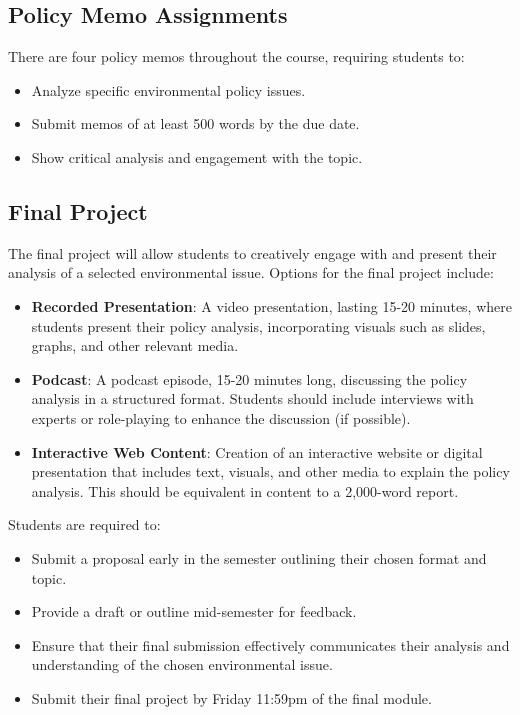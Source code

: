 \documentclass[12pt, letterpaper]{article}
\begin{document}
\subsection*{Policy Memo Assignments}
There are four policy memos throughout the course, requiring students to:
\begin{itemize}
    \item Analyze specific environmental policy issues.
    \item Submit memos of at least 500 words by the due date.
    \item Show critical analysis and engagement with the topic.
\end{itemize}

\subsection*{Final Project}
The final project will allow students to creatively engage with and present their analysis of a selected environmental issue. Options for the final project include:

\begin{itemize}
    \item \textbf{Recorded Presentation}: A video presentation, lasting 15-20 minutes, where students present their policy analysis, incorporating visuals such as slides, graphs, and other relevant media.
    \item \textbf{Podcast}: A podcast episode, 15-20 minutes long, discussing the policy analysis in a structured format. Students should include interviews with experts or role-playing to enhance the discussion (if possible).
    \item \textbf{Interactive Web Content}: Creation of an interactive website or digital presentation that includes text, visuals, and other media to explain the policy analysis. This should be equivalent in content to a 2,000-word report.
\end{itemize}

Students are required to:
\begin{itemize}
    \item Submit a proposal early in the semester outlining their chosen format and topic.
    \item Provide a draft or outline mid-semester for feedback.
    \item Ensure that their final submission effectively communicates their analysis and understanding of the chosen environmental issue.
    \item Submit their final project by Friday 11:59pm of the final module.
\end{itemize}
\end{document}
